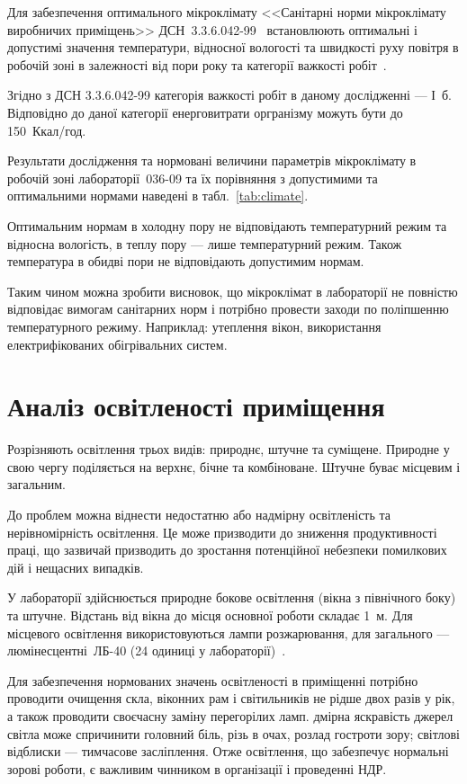 \documentclass[a4paper,fontsize=14bp,ukrainian]{extreport}
\begin{document}
Для забезпечення оптимального мікроклімату <<Санітарні норми мікроклімату виробничих приміщень>> ДСН~3.3.6.042-99~\cite{dsn:microclimate} встановлюють оптимальні і допустимі значення температури, відносної вологості та швидкості руху повітря в робочій зоні в залежності від пори року та категорії важкості робіт~\cite{gelibo2001}.

Згідно з ДСН 3.3.6.042-99 категорія важкості робіт в даному дослідженні --- І~б. Відповідно до даної категорії енерговитрати оргранізму можуть бути до 150~Ккал/год.

Результати дослідження та нормовані величини параметрів мікроклімату в робочій зоні лабораторії~036-09 та їх порівняння з допустимими та оптимальними нормами наведені в табл.~\ref{tab:climate}.



Оптимальним нормам в холодну пору не відповідають температурний режим та відносна вологість, в теплу пору --- лише температурний режим. Також температура в обидві пори не відповідають допустимим нормам.

Таким чином можна зробити висновок, що мікроклімат в лабораторії не повністю відповідає вимогам санітарних норм і потрібно провести заходи по поліпшенню температурного режиму. Наприклад: утеплення вікон, використання електрифікованих обігрівальних систем.




\section{Аналіз освітленості приміщення}

Розрізняють освітлення трьох видів: природнє, штучне та суміщене. Природне у свою чергу поділяється на верхнє, бічне та комбіноване. Штучне буває місцевим і загальним.~\cite{tkachuk2006}

До проблем можна віднести недостатню або надмірну освітленість та нерівномірність освітлення.  Це може призводити до зниження продуктивності праці, що зазвичай призводить до зростання потенційної небезпеки помилкових дій і нещасних випадків.

У лабораторії здійснюється природне бокове освітлення (вікна з північного боку) та штучне. Відстань від вікна до місця основної роботи складає 1~м. Для місцевого освітлення використовуються лампи розжарювання, для загального --- люмінесцентні~ЛБ-40 (24 одиниці у лабораторії)~\cite{snip}.

Для забезпечення нормованих значень освітленості в приміщенні потрібно проводити очищення скла, віконних рам і світильників не рідше двох разів у рік, а також проводити своєчасну заміну перегорілих ламп.
дмірна яскравість джерел світла може спричинити головний біль, різь в очах, розлад гостроти зору; світлові відблиски --- тимчасове засліплення. Отже освітлення, що забезпечує нормальні зорові роботи, є важливим чинником в організації і проведенні НДР.
\end{document}
